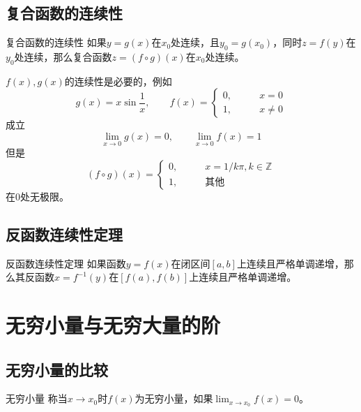 \documentclass[lang = cn, scheme = chinese, thmcnt = section]{elegantbook}
\newcommand{\Z}{\mathbb{Z}}            %
\begin{document}
\subsection{复合函数的连续性}

\begin{theorem}{复合函数的连续性}
	如果$y=g(x)$在$x_0$处连续，且$y_0=g(x_0)$，同时$z=f(y)$在$y_0$处连续，那么复合函数$z=(f\circ g)(x)$在$x_0$处连续。
\end{theorem}

\begin{note}
	$f(x),g(x)$的连续性是必要的，例如
	$$
	g(x)=x\sin\frac{1}{x},\qquad 
	f(x)=\begin{cases}
		0,\qquad & x=0\\
		1,\qquad & x\ne 0
	\end{cases}
	$$
	成立
	$$
	\lim_{x\to 0}g(x)=0,\qquad 
	\lim_{x\to 0}f(x)=1
	$$
	但是
	$$
	(f\circ g)(x)=\begin{cases}
		0,\qquad & x=1/k\pi,k\in\Z\\
		1,\qquad & \text{其他}
	\end{cases}
	$$
	在$0$处无极限。
\end{note}

\subsection{反函数连续性定理}

\begin{theorem}{反函数连续性定理}
	如果函数$y=f(x)$在闭区间$[a,b]$上连续且严格单调递增，那么其反函数$x=f^{-1}(y)$在$[f(a),f(b)]$上连续且严格单调递增。
\end{theorem}

\section{无穷小量与无穷大量的阶}

\subsection{无穷小量的比较}

\begin{definition}{无穷小量}
	称当$x\to x_0$时$f(x)$为无穷小量，如果$\displaystyle \lim_{x\to x_0}f(x)=0$。
\end{definition}
\end{document}
